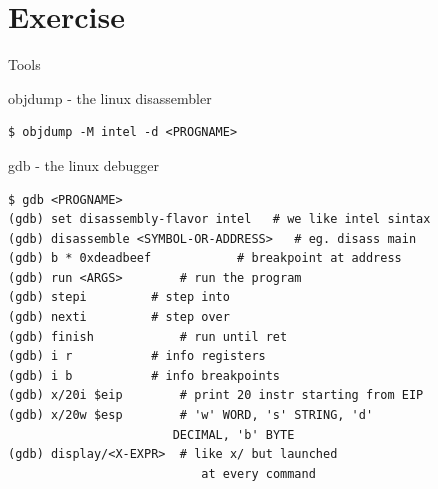 \section{Exercise}


\begin{frame}{Tools}

\begin{block}{objdump - the linux disassembler}
		\begin{verbatim}
$ objdump -M intel -d <PROGNAME>
		\end{verbatim}
\end{block}
\framebreak		
\begin{block}{gdb - the linux debugger}
	\footnotesize
	\begin{verbatim}
$ gdb <PROGNAME>
(gdb) set disassembly-flavor intel   # we like intel sintax
(gdb) disassemble <SYMBOL-OR-ADDRESS>   # eg. disass main
(gdb) b * 0xdeadbeef			# breakpoint at address
(gdb) run <ARGS>	    # run the program
(gdb) stepi         # step into
(gdb) nexti         # step over
(gdb) finish	        # run until ret
(gdb) i r           # info registers
(gdb) i b           # info breakpoints
(gdb) x/20i	$eip	    # print 20 instr starting from EIP
(gdb) x/20w	$esp	    # 'w' WORD, 's' STRING, 'd' 
                       DECIMAL, 'b' BYTE
(gdb) display/<X-EXPR>	# like x/ but launched 
                           at every command
	\end{verbatim}
	\normalsize
\end{block}
\end{frame}

